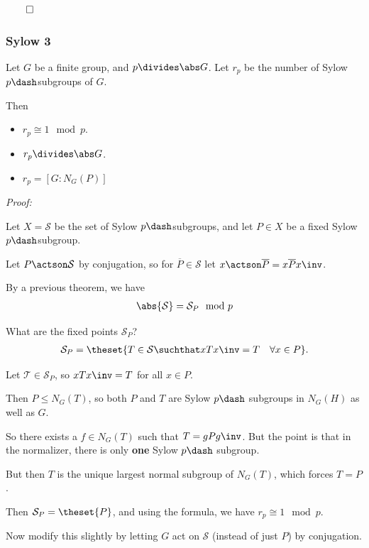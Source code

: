 \(\qed\)

\hypertarget{sylow-3}{%
\subsubsection{Sylow 3}\label{sylow-3}}

Let \(G\) be a finite group, and \(p\divides \abs G\). Let \(r_p\) be
the number of Sylow \(p\dash\)subgroups of \(G\).

Then

\begin{itemize}
\item
  \(r_p \cong 1 \mod p\).
\item
  \(r_p \divides \abs G\).
\item
  \(r_p = [G : N_G(P)]\)
\end{itemize}

\emph{Proof:}

Let \(X = \mathcal S\) be the set of Sylow \(p\dash\)subgroups, and let
\(P \in X\) be a fixed Sylow \(p\dash\)subgroup.

Let \(P \actson \mathcal S\) by conjugation, so for
\(\overline P \in \mathcal S\) let
\(x \actson \overline P = x \overline P x\inv\).

By a previous theorem, we have
\begin{align*}
\abs{\mathcal S} = \mathcal{S}_P \mod p
\end{align*}

What are the fixed points \(\mathcal{S}_P\)?
\begin{align*}
\mathcal{S}_P = \theset{T \in \mathcal S \suchthat xTx\inv  = T \quad \forall x\in P}.
\end{align*}

Let \(\mathcal T \in \mathcal{S}_P\), so \(xTx\inv = T\) for all
\(x\in P\).

Then \(P \leq N_G(T)\), so both \(P\) and \(T\) are Sylow \(p\dash\)
subgroups in \(N_G(H)\) as well as \(G\).

So there exists a \(f\in N_G(T)\) such that \(T = gPg\inv\). But the
point is that in the normalizer, there is only \textbf{one} Sylow
\(p\dash\) subgroup.

But then \(T\) is the unique largest normal subgroup of \(N_G(T)\),
which forces \(T = P\).

Then \(\mathcal{S}_P = \theset{P}\), and using the formula, we have
\(r_p \cong 1 \mod p\).

Now modify this slightly by letting \(G\) act on \(\mathcal S\) (instead
of just \(P\)) by conjugation.

